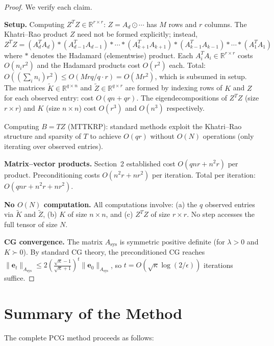 \documentclass[11pt]{article}
\theoremstyle{definition}
\newcommand{\R}{\mathbb{R}}
\begin{document}
\begin{proof}
  We verify each claim.

  \textbf{Setup.} Computing $Z^T Z \in \R^{r \times r}$: $Z = A_d \odot \cdots$ has $M$ rows and $r$ columns. The Khatri--Rao product $Z$ need not be formed explicitly; instead, $Z^T Z = (A_d^T A_d) * (A_{d-1}^T A_{d-1}) * \cdots * (A_{k+1}^T A_{k+1}) * (A_{k-1}^T A_{k-1}) * \cdots * (A_1^T A_1)$ where $*$ denotes the Hadamard (elementwise) product. Each $A_i^T A_i \in \R^{r \times r}$ costs $O(n_i r^2)$ and the Hadamard products cost $O(r^2)$ each. Total: $O((\sum_i n_i)r^2) \leq O(Mrq/q \cdot r) = O(Mr^2)$, which is subsumed in setup. The matrices $\tilde{K} \in \R^{q \times n}$ and $\tilde{Z} \in \R^{q \times r}$ are formed by indexing rows of $K$ and $Z$ for each observed entry: cost $O(qn + qr)$. The eigendecompositions of $Z^T Z$ (size $r \times r$) and $K$ (size $n \times n$) cost $O(r^3)$ and $O(n^3)$ respectively.

  Computing $B = TZ$ (MTTKRP): standard methods exploit the Khatri--Rao structure and sparsity of $T$ to achieve $O(qr)$ without $O(N)$ operations (only iterating over observed entries).

  \textbf{Matrix--vector products.} Section~2 established cost $O(qnr + n^2 r)$ per product. Preconditioning costs $O(n^2 r + nr^2)$ per iteration. Total per iteration: $O(qnr + n^2 r + nr^2)$.

  \textbf{No $O(N)$ computation.} All computations involve: (a) the $q$ observed entries via $\tilde{K}$ and $\tilde{Z}$, (b) $K$ of size $n \times n$, and (c) $Z^T Z$ of size $r \times r$. No step accesses the full tensor of size $N$.

  \textbf{CG convergence.} The matrix $A_{\mathrm{sys}}$ is symmetric positive definite (for $\lambda > 0$ and $K \succ 0$). By standard CG theory, the preconditioned CG reaches $\|\mathbf{e}_t\|_{A_{\mathrm{sys}}} \leq 2\left(\frac{\sqrt{\kappa}-1}{\sqrt{\kappa}+1}\right)^t \|\mathbf{e}_0\|_{A_{\mathrm{sys}}}$, so $t = O(\sqrt{\kappa}\log(2/\epsilon))$ iterations suffice.
\end{proof}

\section{Summary of the Method}

The complete PCG method proceeds as follows:
\end{document}
